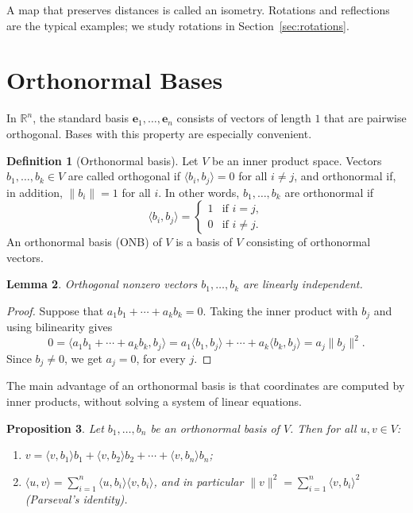 \documentclass[11pt]{article}
\newcommand{\norm}[1]{\lVert #1 \rVert}
\newcommand{\ip}[2]{\langle #1, #2 \rangle}
\theoremstyle{definition}
\newtheorem{definition}{Definition}[section]
\theoremstyle{plain}
\newtheorem{proposition}[definition]{Proposition}
\newtheorem{lemma}[definition]{Lemma}
\theoremstyle{remark}
\begin{document}
A map that preserves distances is called an isometry. Rotations and reflections are the typical examples; we study rotations in Section~\ref{sec:rotations}.

\section{Orthonormal Bases}

In $\mathbb{R}^n$, the standard basis $\mathbf{e}_1, \ldots, \mathbf{e}_n$ consists of vectors of length $1$ that are pairwise orthogonal. Bases with this property are especially convenient.

\begin{definition}[Orthonormal basis]
    Let $V$ be an inner product space. Vectors $b_1, \ldots, b_k \in V$ are called orthogonal if $\ip{b_i}{b_j} = 0$ for all $i \neq j$, and orthonormal if, in addition, $\norm{b_i} = 1$ for all $i$. In other words, $b_1, \ldots, b_k$ are orthonormal if
    \[\ip{b_i}{b_j} = \begin{cases} 1 & \text{if } i = j, \\ 0 & \text{if } i \neq j. \end{cases}\]
    An orthonormal basis (ONB) of $V$ is a basis of $V$ consisting of orthonormal vectors.
\end{definition}

\begin{lemma}\label{lem:orth-indep}
    Orthogonal nonzero vectors $b_1, \ldots, b_k$ are linearly independent.
\end{lemma}

\begin{proof}
    Suppose that $a_1 b_1 + \cdots + a_k b_k = 0$. Taking the inner product with $b_j$ and using bilinearity gives
    \[0 = \ip{a_1 b_1 + \cdots + a_k b_k}{b_j} = a_1 \ip{b_1}{b_j} + \cdots + a_k \ip{b_k}{b_j} = a_j \norm{b_j}^2.\]
    Since $b_j \neq 0$, we get $a_j = 0$, for every $j$.
\end{proof}

The main advantage of an orthonormal basis is that coordinates are computed by inner products, without solving a system of linear equations.

\begin{proposition}\label{prop:onb-coordinates}
    Let $b_1, \ldots, b_n$ be an orthonormal basis of $V$. Then for all $u, v \in V$:
    \begin{enumerate}
        \item $v = \ip{v}{b_1} b_1 + \ip{v}{b_2} b_2 + \cdots + \ip{v}{b_n} b_n$;
        \item $\ip{u}{v} = \sum_{i=1}^n \ip{u}{b_i} \ip{v}{b_i}$, and in particular $\norm{v}^2 = \sum_{i=1}^n \ip{v}{b_i}^2$ (Parseval's identity).
    \end{enumerate}
\end{proposition}
\end{document}

